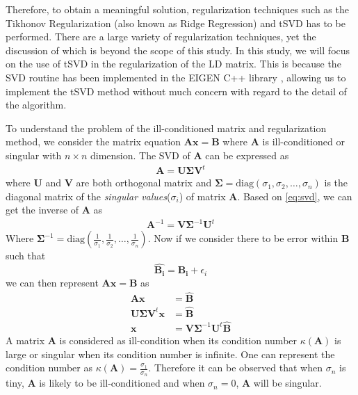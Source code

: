 			Therefore, to obtain a meaningful solution, regularization techniques such as the Tikhonov Regularization (also known as Ridge Regression) and \gls{tSVD} has to be performed\citep{Neumaier1998}. 
			There are a large variety of regularization techniques, yet the discussion of which is beyond the scope of this study. 
			In this study, we will focus on the use of \gls{tSVD} in the regularization of the \gls{LD} matrix.
			This is because the \gls{SVD} routine has been implemented in the EIGEN C++ library \citep{eigenweb}, allowing us to implement the \gls{tSVD} method without much concern with regard to the detail of the algorithm. 
			
			To understand the problem of the ill-conditioned matrix and regularization method, we consider the matrix equation $\boldsymbol{Ax}=\boldsymbol{B}$ where $\boldsymbol{A}$ is ill-conditioned or singular with $n\times n$ dimension.
			The \gls{SVD} of $\boldsymbol{A}$ can be expressed as 
			\begin{align}
				\boldsymbol{A} = \boldsymbol{U\Sigma V}^t
				\label{eq:svd}
			\end{align}
			where $\boldsymbol{U}$ and $\boldsymbol{V}$ are both orthogonal matrix and $\boldsymbol{\Sigma}=\mathrm{diag}(\sigma_1,\sigma_2,\dots,\sigma_n)$ is the diagonal matrix of the \emph{singular values}($\sigma_i$) of matrix $\boldsymbol{A}$.
			Based on \cref{eq:svd}, we can get the inverse of $\boldsymbol{A}$ as 
			\begin{align}
				\boldsymbol{A}^{-1}= \boldsymbol{V\Sigma}^{-1}\boldsymbol{U}^t
				\label{eq:svdInverse}
			\end{align}
			Where $
			\boldsymbol{\Sigma}^{-1} = \mathrm{diag}(\frac{1}{\sigma_1},\frac{1}{\sigma_2},\dots,\frac{1}{\sigma_n})$.
			Now if we consider there to be error within $\boldsymbol{B}$ such that
			\begin{equation}
				\boldsymbol{\hat{B_i}} = \boldsymbol{B_i}+\epsilon_i
				\label{eq:errorB}
			\end{equation}
			we can then represent $\boldsymbol{Ax}=\boldsymbol{B}$ as
			\begin{align}
				\boldsymbol{Ax}&=\boldsymbol{\hat{B}} \nonumber\\
				\boldsymbol{U\Sigma V}^t\boldsymbol{x}&=\boldsymbol{\hat{B}} \nonumber\\
				\boldsymbol{x}&=\boldsymbol{V\Sigma}^{-1}\boldsymbol{U}^t\boldsymbol{\hat{B}}
				\label{eq:solveBwithError}
			\end{align}
			A matrix $\boldsymbol{A}$ is considered as ill-condition when its condition number $\kappa(\boldsymbol{A})$ is large or singular when its condition number is infinite. 
			One can represent the condition number as $\kappa(\boldsymbol{A})=\frac{\sigma_1}{\sigma_n}$.
			Therefore it can be observed that when $\sigma_n$ is tiny, $\boldsymbol{A}$ is likely to be ill-conditioned and when $\sigma_n=0$, $\boldsymbol{A}$ will be singular. 
			
